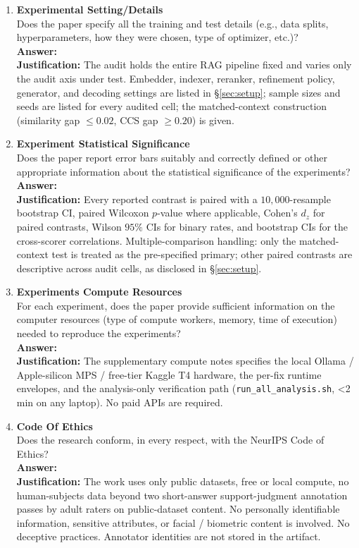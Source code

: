 \begin{enumerate}
\item {\bf Experimental Setting/Details}\\
Does the paper specify all the training and test details (e.g., data
splits, hyperparameters, how they were chosen, type of optimizer,
etc.)?
\\\textbf{Answer: \answerYes{}}
\\\textbf{Justification:} The audit holds the entire RAG pipeline
fixed and varies only the audit axis under test. Embedder, indexer,
reranker, refinement policy, generator, and decoding settings are
listed in \S\ref{sec:setup}; sample sizes and seeds are listed for
every audited cell; the matched-context construction (similarity gap
$\leq 0.02$, CCS gap $\geq 0.20$) is given.

\item {\bf Experiment Statistical Significance}\\
Does the paper report error bars suitably and correctly defined or
other appropriate information about the statistical significance of
the experiments?
\\\textbf{Answer: \answerYes{}}
\\\textbf{Justification:} Every reported contrast is paired with a
$10{,}000$-resample bootstrap CI, paired Wilcoxon $p$-value where
applicable, Cohen's $d_z$ for paired contrasts, Wilson $95\%$ CIs for
binary rates, and bootstrap CIs for the cross-scorer correlations.
Multiple-comparison handling: only the matched-context test is
treated as the pre-specified primary; other paired contrasts are
descriptive across audit cells, as disclosed in \S\ref{sec:setup}.

\item {\bf Experiments Compute Resources}\\
For each experiment, does the paper provide sufficient information on
the computer resources (type of compute workers, memory, time of
execution) needed to reproduce the experiments?
\\\textbf{Answer: \answerYes{}}
\\\textbf{Justification:} The supplementary compute notes
specifies the local Ollama / Apple-silicon MPS / free-tier Kaggle T4
hardware, the per-fix runtime envelopes, and the analysis-only
verification path (\texttt{run\_all\_analysis.sh}, \textless 2 min on
any laptop). No paid APIs are required.

\item {\bf Code Of Ethics}\\
Does the research conform, in every respect, with the NeurIPS Code of
Ethics?
\\\textbf{Answer: \answerYes{}}
\\\textbf{Justification:} The work uses only public datasets, free or
local compute, no human-subjects data beyond two short-answer
support-judgment annotation passes by adult raters on public-dataset
content. No personally identifiable information, sensitive attributes,
or facial / biometric content is involved. No deceptive practices.
Annotator identities are not stored in the artifact.


\end{enumerate}
